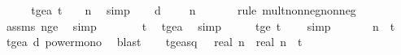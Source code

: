 \begin{isabellebody}
\ \ \isamarkupfalse%
\ \isamarkupfalse%
\ t{\isacharunderscore}{\kern0pt}ge{\isacharunderscore}{\kern0pt}a{\isacharcolon}{\kern0pt}\ {\isachardoublequoteopen}t\ {\isasymge}\ {\isasymalpha}\ {\isacharasterisk}{\kern0pt}\ n{\isachardoublequoteclose}\ \isamarkupfalse%
\ simp\isanewline
\isanewline
\ \ \isamarkupfalse%
\ d{\isacharcolon}{\kern0pt}\ {\isachardoublequoteopen}{}\ {\isasymle}\ {\isasymalpha}\ {\isacharasterisk}{\kern0pt}\ n{\isachardoublequoteclose}\ \isanewline
\ \ \ \ \isamarkupfalse%
\ {\isacharparenleft}{\kern0pt}rule\ mult{\isacharunderscore}{\kern0pt}nonneg{\isacharunderscore}{\kern0pt}nonneg{\isacharparenright}{\kern0pt}\isanewline
\ \ \ \ \isamarkupfalse%
\ assms{\isacharparenleft}{\kern0pt}{}{\isacharparenright}{\kern0pt}\ n{\isacharunderscore}{\kern0pt}ge{\isacharunderscore}{\kern0pt}{}\ \isamarkupfalse%
\ simp{\isacharplus}{\kern0pt}\isanewline
\ \ \isamarkupfalse%
\ \isamarkupfalse%
\ {\isachardoublequoteopen}{\isachardot}{\kern0pt}{\isachardot}{\kern0pt}{\isachardot}{\kern0pt}\ {\isasymle}\ t{\isachardoublequoteclose}\ \isamarkupfalse%
\ t{\isacharunderscore}{\kern0pt}ge{\isacharunderscore}{\kern0pt}a\ \isamarkupfalse%
\ simp\isanewline
\ \ \isamarkupfalse%
\ \isamarkupfalse%
\ t{\isacharunderscore}{\kern0pt}ge{\isacharunderscore}{\kern0pt}{}{\isacharcolon}{\kern0pt}\ {\isachardoublequoteopen}t\ {\isasymge}\ {}{\isachardoublequoteclose}\ \isamarkupfalse%
\ simp\isanewline
\isanewline
\ \ \isamarkupfalse%
\ \ {\isachardoublequoteopen}{\isacharparenleft}{\kern0pt}{\isasymalpha}\ {\isacharasterisk}{\kern0pt}\ n{\isacharparenright}{\kern0pt}\ {\isasymle}\ t\ \isamarkupfalse%
\ t{\isacharunderscore}{\kern0pt}ge{\isacharunderscore}{\kern0pt}a\ d\ power{\isacharunderscore}{\kern0pt}mono\ \isamarkupfalse%
\ blast\isanewline
\ \ \isamarkupfalse%
\ t{\isacharunderscore}{\kern0pt}ge{\isacharunderscore}{\kern0pt}a{\isacharunderscore}{\kern0pt}sq{\isacharcolon}{\kern0pt}\ {\isachardoublequoteopen}{\isasymalpha}\ {\isacharasterisk}{\kern0pt}\ real\ n\ {\isacharasterisk}{\kern0pt}\ real\ n\ {\isasymle}\ t\isanewline
\ \ \ \ \isamarkupfalse%

\end{isabellebody}
